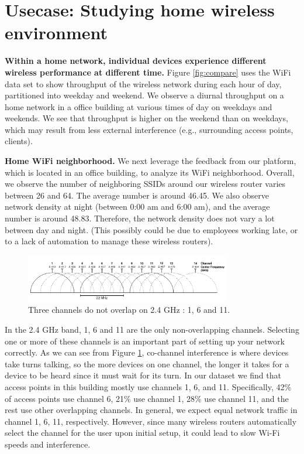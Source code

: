 \section{Usecase: Studying home wireless environment}
\label{sec.usecase3}

\textbf{Within a home network, individual devices experience different wireless performance at different time.} Figure \ref{fig:compare} uses the WiFi data set to show throughput of the wireless network during each hour of day, partitioned into weekday and weekend. We observe a diurnal throughput on a home network in a office building at various times of day on weekdays and weekends. We see that throughput is higher on the weekend than
on weekdays, which may result from less external interference (e.g., surrounding access points, clients).

\textbf{Home WiFi neighborhood.} We next leverage the feedback from our platform, which is located in an office building, to analyze its WiFi neighborhood. Overall, we observe the number of neighboring SSIDs around our wireless router varies between 26 and 64. The average number is around 46.45. We also observe network density at night (between 0:00 am and 6:00 am), and the average number is around 48.83. Therefore, the network density does not vary a lot between day and night. (This possibly could be due to employees working late, or to
a lack of automation to manage these wireless routers).

\begin{figure}
\centering
\includegraphics[width=0.8\textwidth]{figure/2GHz_WiFi_channels.png}
\caption{Three channels do not overlap on 2.4 GHz : 1, 6 and 11.}
\label{fig:channels}
\end{figure}

In the 2.4 GHz band, 1, 6 and 11 are the only non-overlapping channels. Selecting one or more of these channels is an important part of setting up your network correctly. As we can see from Figure \ref{fig:channels}, co-channel interference is where devices take turns talking, so the more devices on one channel, the longer it takes for a device to be heard since it must wait for its turn. In our dataset we find that access points in this building mostly use channels 1, 6, and 11. Specifically, 42\% of access points use channel 6, 21\% use channel 1, 28\% use channel 11, and the rest use other overlapping channels. In general, we expect equal network traffic in channel 1, 6, 11, respectively. However, since many wireless routers automatically select the channel for the user upon initial setup, it could lead to slow Wi-Fi speeds and interference.

